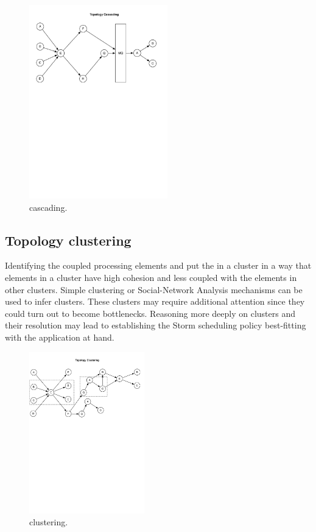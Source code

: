 \begin{figure}[H]
	\begin{center}
		\includegraphics[width=6cm]{images/cascading}
		\caption{cascading.}
		\label{fig:cascading}
	\end{center}
\end{figure}

\subsection{Topology clustering}
Identifying the coupled processing elements and put the in a cluster in a way that elements in a cluster have high cohesion and less coupled with the elements in other clusters. Simple clustering or Social-Network Analysis mechanisms can be used to infer clusters. These clusters may require additional attention since they could turn out to become bottlenecks. Reasoning more deeply on clusters and their resolution may lead to establishing the Storm scheduling policy best-fitting with the application at hand.

\begin{figure}[H]
	\begin{center}
		\includegraphics[width=5cm]{images/clustering}
		\caption{clustering.}
		\label{fig:clustering}
	\end{center}
\end{figure}

